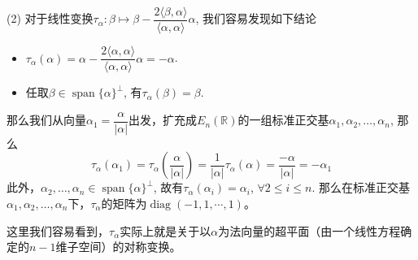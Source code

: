 (2) 对于线性变换$\tau_{\alpha}: \beta \mapsto \beta - \dfrac{2\langle \beta, \alpha \rangle}{\langle \alpha, \alpha \rangle} \alpha$, 我们容易发现如下结论
\begin{itemize}
\item $\tau_{\alpha}(\alpha) = \alpha - \dfrac{2\langle \alpha, \alpha \rangle}{\langle \alpha, \alpha \rangle} \alpha = -\alpha$.
\item 任取$\beta \in \operatorname{span}\{\alpha\}^{\perp}$, 有$\tau_{\alpha}(\beta) = \beta$.
\end{itemize}
那么我们从向量$\alpha_1 = \dfrac{\alpha}{\lvert \alpha \rvert}$出发，扩充成$E_n(\mathbb{R})$的一组标准正交基$\alpha_1, \alpha_2, \ldots, \alpha_n$, 那么
$$\tau_{\alpha}(\alpha_1) = \tau_{\alpha}(\dfrac{\alpha}{\lvert \alpha \rvert}) = \dfrac{1}{\lvert \alpha \rvert} \tau_{\alpha}(\alpha) = \dfrac{-\alpha}{\lvert \alpha \rvert} = -\alpha_1$$
此外，$\alpha_2, \ldots, \alpha_n \in \operatorname{span}\{\alpha\}^{\perp}$, 故有$\tau_{\alpha}(\alpha_i) = \alpha_i$, $\forall 2 \leqslant i \leqslant n$. 那么在标准正交基$\alpha_1, \alpha_2, \ldots, \alpha_n$下，$\tau_{\alpha}$的矩阵为$\operatorname{diag}(-1, 1, \cdots, 1)$。

这里我们容易看到，$\tau_{\alpha}$实际上就是关于以$\alpha$为法向量的超平面（由一个线性方程确定的$n-1$维子空间）的对称变换。


